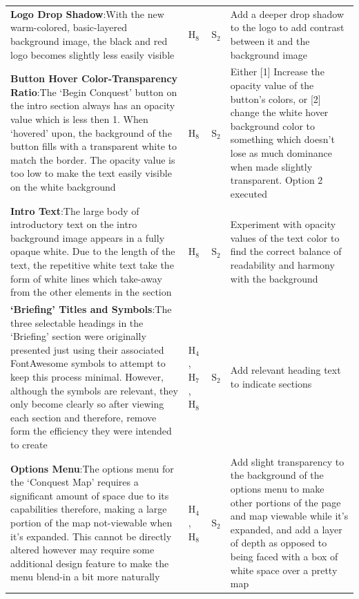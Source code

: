 \documentclass[11pt, english]{article}
\begin{document}
\begin{center}
\begin{longtable}{p{7.5cm}p{0.5cm}p{0.5cm}p{4cm}}
		\textbf{Logo Drop Shadow}:\newline With the new warm-colored, basic-layered background image, the black and red logo becomes slightly less easily visible & $\mathrm{H_{8}}$ & $\mathrm{S_{2}}$ & Add a deeper drop shadow to the logo to add contrast between it and the background image\\
		\textbf{Button Hover Color-Transparency Ratio}:\newline The `Begin Conquest' button on the intro section always has an opacity value which is less then 1. When `hovered' upon, the background of the button fills with a transparent white to match the border. The opacity value is too low to make the text easily visible on the white background & $\mathrm{H_{8}}$ & $\mathrm{S_{2}}$ & Either [1] Increase the opacity value of the button's colors, or [2] change the white hover background color to something which doesn't lose as much dominance when made slightly transparent. Option 2 executed\\
		\textbf{Intro Text}:\newline The large body of introductory text on the intro background image appears in a fully opaque white. Due to the length of the text, the repetitive white text take the form of white lines which take-away from the other elements in the section & $\mathrm{H_{8}}$ & $\mathrm{S_{2}}$ & Experiment with opacity values of the text color to find the correct balance of readability and harmony with the background\\
		\textbf{`Briefing' Titles and Symbols}:\newline The three selectable headings in the `Briefing' section were originally presented just using their associated FontAwesome symbols to attempt to keep this process minimal. However, although the symbols are relevant, they only become clearly so after viewing each section and therefore, remove form the efficiency they were intended to create & $\mathrm{H_{4}}$, $\mathrm{H_{7}}$, $\mathrm{H_{8}}$ & $\mathrm{S_{2}}$ & Add relevant heading text to indicate sections\\
		\textbf{Options Menu}:\newline The options menu for the `Conquest Map' requires a significant amount of space due to its capabilities therefore, making a large portion of the map not-viewable when it's expanded. This cannot be directly altered however may require some additional design feature to make the menu blend-in a bit more naturally & $\mathrm{H_{4}}$, $\mathrm{H_{8}}$ & $\mathrm{S_{2}}$ & Add slight transparency to the background of the options menu to make other portions of the page and map viewable while it's expanded, and add a layer of depth as opposed to being faced with a box of white space over a pretty map\\

\end{longtable}
\end{center}
\end{document}
